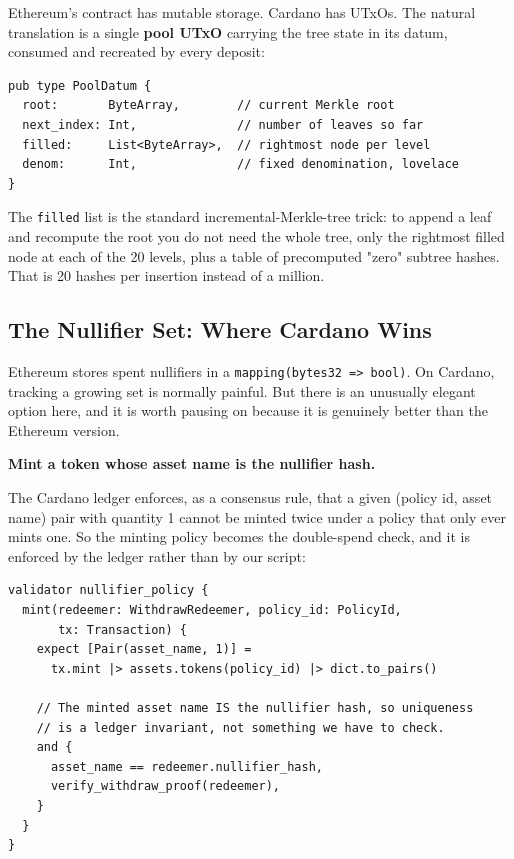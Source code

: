 Ethereum's contract has mutable storage. Cardano has UTxOs. The natural
translation is a single \textbf{pool UTxO} carrying the tree state in its datum,
consumed and recreated by every deposit:

\begin{verbatim}
pub type PoolDatum {
  root:       ByteArray,        // current Merkle root
  next_index: Int,              // number of leaves so far
  filled:     List<ByteArray>,  // rightmost node per level
  denom:      Int,              // fixed denomination, lovelace
}
\end{verbatim}

The \texttt{filled} list is the standard incremental-Merkle-tree trick: to
append a leaf and recompute the root you do not need the whole tree, only the
rightmost filled node at each of the 20 levels, plus a table of precomputed
"zero" subtree hashes. That is 20 hashes per insertion instead of a million.

\subsection*{The Nullifier Set: Where Cardano Wins}

Ethereum stores spent nullifiers in a \texttt{mapping(bytes32 => bool)}. On
Cardano, tracking a growing set is normally painful. But there is an unusually
elegant option here, and it is worth pausing on because it is genuinely better
than the Ethereum version.

\textbf{Mint a token whose asset name is the nullifier hash.}

The Cardano ledger enforces, as a consensus rule, that a given
(policy id, asset name) pair with quantity 1 cannot be minted twice under a
policy that only ever mints one. So the minting policy becomes the
double-spend check, and it is enforced by the ledger rather than by our script:

\begin{verbatim}
validator nullifier_policy {
  mint(redeemer: WithdrawRedeemer, policy_id: PolicyId,
       tx: Transaction) {
    expect [Pair(asset_name, 1)] =
      tx.mint |> assets.tokens(policy_id) |> dict.to_pairs()

    // The minted asset name IS the nullifier hash, so uniqueness
    // is a ledger invariant, not something we have to check.
    and {
      asset_name == redeemer.nullifier_hash,
      verify_withdraw_proof(redeemer),
    }
  }
}
\end{verbatim}

